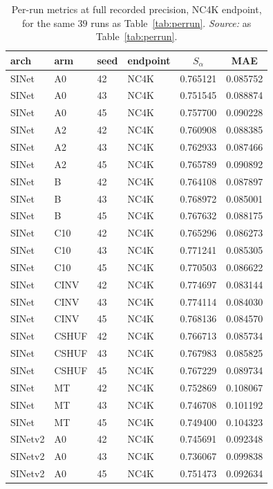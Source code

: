 \begin{table}[p]
\caption{Per-run metrics at full recorded precision, NC4K endpoint, for the same $39$ runs as
Table~\ref{tab:perrun}. \emph{Source:} as Table~\ref{tab:perrun}.}
\label{tab:perrun-nc4k}
\begin{center}\small
\begin{tabular}{llllcc}
\toprule
arch & arm & seed & endpoint & $S_\alpha$ & MAE \\
\midrule
SINet & A0 & 42 & NC4K & 0.765121 & 0.085752 \\
SINet & A0 & 43 & NC4K & 0.751545 & 0.088874 \\
SINet & A0 & 45 & NC4K & 0.757700 & 0.090228 \\
SINet & A2 & 42 & NC4K & 0.760908 & 0.088385 \\
SINet & A2 & 43 & NC4K & 0.762933 & 0.087466 \\
SINet & A2 & 45 & NC4K & 0.765789 & 0.090892 \\
SINet & B & 42 & NC4K & 0.764108 & 0.087897 \\
SINet & B & 43 & NC4K & 0.768972 & 0.085001 \\
SINet & B & 45 & NC4K & 0.767632 & 0.088175 \\
SINet & C10 & 42 & NC4K & 0.765296 & 0.086273 \\
SINet & C10 & 43 & NC4K & 0.771241 & 0.085305 \\
SINet & C10 & 45 & NC4K & 0.770503 & 0.086622 \\
SINet & CINV & 42 & NC4K & 0.774697 & 0.083144 \\
SINet & CINV & 43 & NC4K & 0.774114 & 0.084030 \\
SINet & CINV & 45 & NC4K & 0.768136 & 0.084570 \\
SINet & CSHUF & 42 & NC4K & 0.766713 & 0.085734 \\
SINet & CSHUF & 43 & NC4K & 0.767983 & 0.085825 \\
SINet & CSHUF & 45 & NC4K & 0.767229 & 0.089734 \\
SINet & MT & 42 & NC4K & 0.752869 & 0.108067 \\
SINet & MT & 43 & NC4K & 0.746708 & 0.101192 \\
SINet & MT & 45 & NC4K & 0.749400 & 0.104323 \\
SINetv2 & A0 & 42 & NC4K & 0.745691 & 0.092348 \\
SINetv2 & A0 & 43 & NC4K & 0.736067 & 0.099838 \\
SINetv2 & A0 & 45 & NC4K & 0.751473 & 0.092634 \\

\end{tabular}
\end{center}
\end{table}
